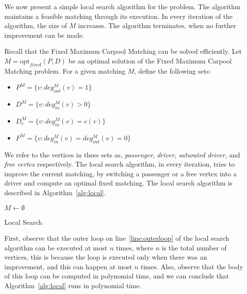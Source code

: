 \documentclass[draft]{article}
\def\N{\mathbb{N}}
\newcommand{\din}[1][M]{deg^M_{in}}
\newcommand{\dout}[1][M]{deg^M_{out}}
\def\FIXEDCARPOOL{Fixed Maximum Carpool Matching}
\begin{document}
We now present a simple local search algorithm for the problem. 
The algorithm maintains a feasible matching through its execution.
In every iteration of the algorithm, the size of $M$ increases.
The algorithm terminates, when no further improvement can be made. 

Recall that the \FIXEDCARPOOL{} can be solved efficiently.
Let $M = \text{opt}_{fixed}(P, D)$ be an optimal solution of the
\FIXEDCARPOOL{} problem.
%
For a given matching $M$, define the following sets:
\begin{itemize}
\item $P^M = \{v : \dout(v) = 1\}$
\item $D^M = \{v : \din(v) > 0\}$
\item $D^M_c = \{v : \din(v) = c(v)\}$
\item $F^M = \{v : \din(v) = \dout(v) = 0\}$ 
\end{itemize}
We refer to the vertices in these sets as, \emph{passenger}, 
\emph{driver}, \emph{saturated driver}, and \emph{free vertex} respectively.
The local search algorithm, in every iteration, 
tries to improve the current matching, 
by switching a passenger or a free vertex into a driver 
and compute an optimal fixed matching.
The local search algorithm is described in
Algorithm~\ref{alg:local}.

\begin{algorithm}
\KwIn{$G = (V, A)$, $c : V \rightarrow \N$}
$M \leftarrow \emptyset$					\\

\caption{
\label{alg:local}
Local Search}
\end{algorithm}

First, observe that the outer loop on line~\ref{line:outerloop} of the local search algorithm
can be executed at most $n$ times, 
where $n$ is the total number of vertices, 
this is because the loop is executed only when there was an improvement, 
and this can happen at most $n$ times.
Also, observe that the body of this loop can be computed in polynomial time, 
and we can conclude that Algorithm~\ref{alg:local} runs in polynomial time.
    
\end{document}
